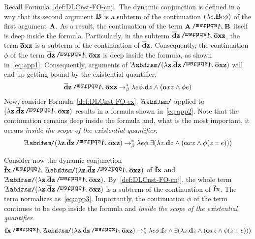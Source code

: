 Recall Formula~\eqref{def:DLCnst-FO-cnj}. The dynamic conjunction is defined in a way that its second argument $\B2$ is a subterm of the continuation $(\lambda e. \B2 e \phi)$ of the first argument $\A2$. As a result, the continuation of the term $\A2 \cnj2 \B2$ itself is deep inside the formula. Particularly, in the subterm $ \tr{\cdonkey}  \z2 \cnj2 \tr{\cown}  \x2 \z2 $, the term $\tr{\cown}  \x2 \z2$ is a subterm of the continuation of $\tr{\cdonkey}  \z2$. Consequently, the continuation $\phi$ of the term $\tr{\cdonkey}  \z2 \cnj2 \tr{\cown}  \x2 \z2$ is deep inside the formula, as shown in~\eqref{eq:app1}.  
Consequently, arguments of $ \ex2 (\lambda \z2.  \tr{\cdonkey}  \z2 \cnj2 \tr{\cown}  \x2 \z2  ) $ will end up getting bound by the existential quantifier.
\begin{align}
\tr{\cdonkey}  \z2 \cnj2 \tr{\cown}  \x2 \z2 \bred  \lambda e \phi. \cdonkey \z1 \cnj1 ( \cown \x1  \z1 \cnj1 \phi e)  \label{eq:app1}
\end{align}
 Now, consider Formula~\eqref{def:DLCnst-FO-ex}. $\ex2$ applied to $ ( \lambda \z2. \tr{\cdonkey}  \z2 \cnj2 \tr{\cown}  \x2 \z2)$ results in a formula shown in~\eqref{eq:app2}. Note that the continuation remains deep inside the formula and, what is the most important, it occurs \emph{inside the scope of the existential quantifier}:
 \begin{align}
 \ex2 (\lambda \z2.  \tr{\cdonkey}  \z2 \cnj2 \tr{\cown}  \x2 \z2  ) \bred  \lambda e \phi. \ex1 ( \lambda \z1. \cdonkey \z1  \cnj1 ( \cown \x1 \z1 \cnj1 \phi (\z1::e)) )  \label{eq:app2}
 \end{align}

Consider now the dynamic conjunction $ \tr{\cfarmer}  \x2  \cnj2 \ex2 (\lambda \z2.  \tr{\cdonkey}  \z2 \cnj2 \tr{\cown}  \x2 \z2  )$ of $\tr{\cfarmer}  \x2 $ and $\ex2 (\lambda \z2.  \tr{\cdonkey}  \z2 \cnj2 \tr{\cown}  \x2 \z2  ) $. By~\eqref{def:DLCnst-FO-cnj}, the whole term $\ex2 (\lambda \z2.  \tr{\cdonkey}  \z2 \cnj2 \tr{\cown}  \x2 \z2  ) $ is a subterm of the continuation of $\tr{\cfarmer}  \x2 $. The term normalizes as~\eqref{eq:app3}. Importantly, the continuation $\phi$ of the term continues to be deep inside the formula and \emph{inside} \emph{the scope of the existential quantifier}.
\begin{align}
 \tr{\cfarmer}  \x2  \cnj2 \ex2 (\lambda \z2.  \tr{\cdonkey}  \z2 \cnj2 \tr{\cown}  \x2 \z2  )  \bred  \lambda e \phi. \cfarmer \x1  \cnj1 \ex1 ( \lambda \z1. \cdonkey \z1  \cnj1 ( \cown \x1  \z1 \cnj1 \phi  (\z1::e) ) )  \label{eq:app3}
\end{align}

